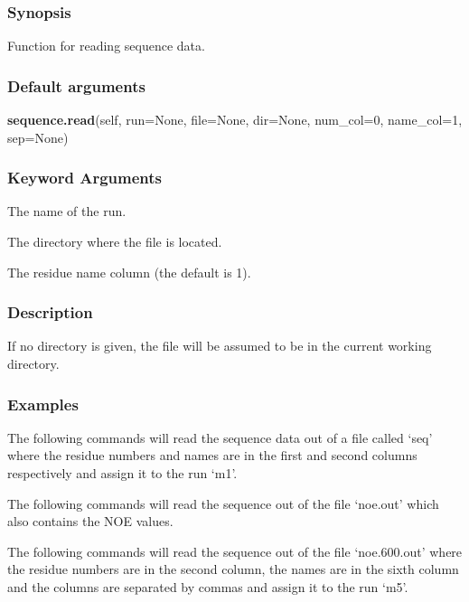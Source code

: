 \subsubsection{Synopsis}

Function for reading sequence data.

\subsubsection{Default arguments}

\textsf{\textbf{sequence.read}(self, run=None, file=None, dir=None, num\_col=0, name\_col=1, sep=None)}


\subsubsection{Keyword Arguments}

  The name of the run.

  The directory where the file is located.

  The residue name column (the default is 1).


\subsubsection{Description}

If no directory is given, the file will be assumed to be in the current working directory.


\subsubsection{Examples}

The following commands will read the sequence data out of a file called `seq' where the
residue numbers and names are in the first and second columns respectively and assign it to
the run `m1'.




The following commands will read the sequence out of the file `noe.out' which also contains
the NOE values.




The following commands will read the sequence out of the file `noe.600.out' where the
residue numbers are in the second column, the names are in the sixth column and the columns
are separated by commas and assign it to the run `m5'.

